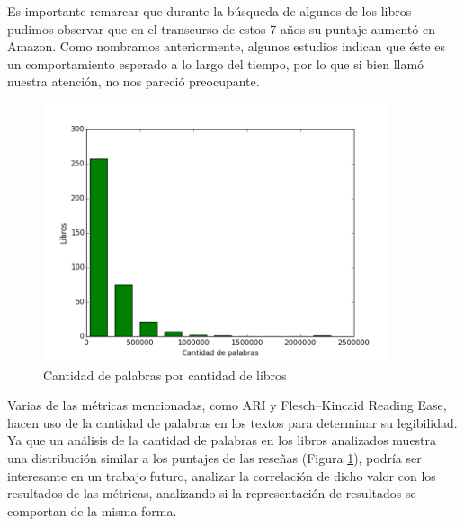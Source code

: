 \documentclass[12pt,journal,compsoc]{IEEEtran}
\begin{document}
Es importante remarcar que durante la búsqueda de algunos de los libros pudimos observar que en el transcurso de estos 7 años su puntaje aumentó en Amazon. Como nombramos anteriormente, algunos estudios indican que éste es un comportamiento esperado a lo largo del tiempo\cite{zhang}, por lo que si bien llamó nuestra atención, no nos pareció preocupante.

\begin{figure}[H]
\begin{center}
  \includegraphics[width=4.0in]{../unigrams/scripts/histogram/histogramaDePalabras.png}
  \caption{\small Cantidad de palabras por cantidad de libros}
  \label{fig:cantPalabrasVsCantLibros}
  \end{center}
\end{figure}

Varias de las métricas mencionadas, como ARI y Flesch–Kincaid Reading Ease, hacen uso de la cantidad de palabras en los textos para determinar su legibilidad. Ya que un análisis de la cantidad de palabras en los libros analizados muestra una distribución similar a los puntajes de las reseñas (Figura \ref{fig:cantPalabrasVsCantLibros}), podría ser interesante en un trabajo futuro, analizar la correlación de dicho valor con los resultados de las métricas, analizando si la representación de resultados se comportan de la misma forma.
\end{document}
